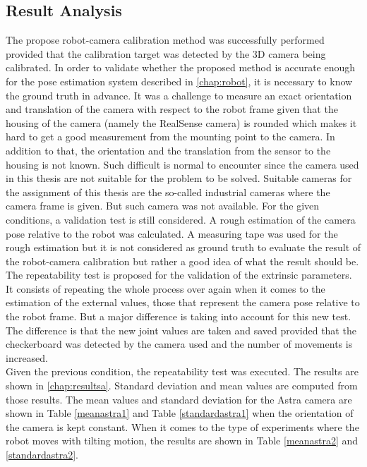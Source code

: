 \subsection{Result Analysis}

The propose robot-camera calibration method was successfully performed provided that the calibration target was detected by the 3D camera being calibrated. In order to validate whether the proposed method is accurate enough for the pose estimation system described in \ref{chap:robot}, it is necessary to know the ground truth in advance. It was a challenge to measure an exact orientation and translation of the camera with respect to the robot frame given that the housing of the camera (namely the RealSense camera) is rounded which makes it hard to get a good measurement from the mounting point to the camera. In addition to that, the orientation and the translation from the sensor to the housing is not known. Such difficult is normal to encounter since the camera used in this thesis are not suitable for the problem to be solved. Suitable cameras for the assignment of this thesis are the so-called industrial cameras where the camera frame is given. But such camera was not available.  
For the given conditions, a validation test is still considered. A rough estimation of the camera pose relative to the robot was calculated. A measuring tape was used for the rough estimation but it is not considered as ground truth to evaluate the result of the robot-camera calibration but rather a good idea of what the result should be. \\
The repeatability test is proposed for the validation of the extrinsic parameters. It consists of repeating the whole process over again when it comes to the estimation of the external values, those that represent the camera pose relative to the robot frame. But a major difference is taking into account for this new test. The difference is that the new joint values are taken and saved provided that the checkerboard was detected by the camera used and the number of movements is increased.\\
Given the previous condition, the repeatability test was executed. The results are shown in \ref{chap:resultsa}. Standard deviation and mean values are computed from those results. The mean values and standard deviation for the Astra camera are shown in Table \ref{meanastra1} and Table \ref{standardastra1} when the orientation of the camera is kept constant. When it comes to the type of experiments where the robot moves with tilting motion, the results are shown in Table \ref{meanastra2} and \ref{standardastra2}.\\
